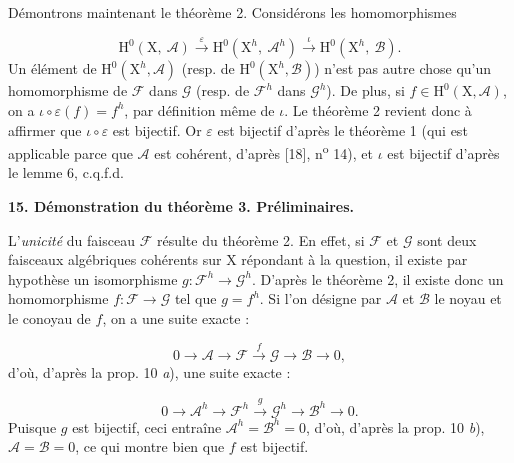 
Démontrons maintenant le théorème 2. Considérons les homomorphismes

\begin{equation*}
\mathrm{H}^0(\mathrm{X},\ \mathcal{A}) \xrightarrow{\varepsilon} \mathrm{H}^0(\mathrm{X}^h,\ \mathcal{A}^h) \xrightarrow{\iota} \mathrm{H}^0(\mathrm{X}^h,\ \mathcal{B}).
\end{equation*}
Un élément de $\mathrm{H}^0(\mathrm{X}^h, \mathcal{A})$ (resp. de $\mathrm{H}^0(\mathrm{X}^h, \mathcal{B})$) n'est pas autre chose qu'un homomorphisme de $\mathcal{F}$ dans $\mathcal{G}$ (resp. de $\mathcal{F}^h$ dans $\mathcal{G}^h$). De plus, si $f \in \mathrm{H}^0(\mathrm{X}, \mathcal{A})$, on a $\iota \circ \varepsilon(f) = f^h$, par définition même de $\iota$. Le théorème 2 revient donc à affirmer que $\iota \circ \varepsilon$ est bijectif. Or $\varepsilon$ est bijectif d'après le théorème 1 (qui est applicable parce que $\mathcal{A}$ est cohérent, d'après [18], n\textsuperscript{o} 14), et $\iota$ est bijectif d'après le lemme 6, c.q.f.d.


\textbf{15. Démonstration du théorème 3. Préliminaires.}

L'\textit{unicité} du faisceau $\mathcal{F}$ résulte du théorème 2. En effet, si $\mathcal{F}$ et $\mathcal{G}$ sont deux faisceaux algébriques cohérents sur $\mathrm{X}$ répondant à la question, il existe par hypothèse un isomorphisme $g : \mathcal{F}^h \to \mathcal{G}^h$. D'après le théorème 2, il existe donc un homomorphisme $f : \mathcal{F} \to \mathcal{G}$ tel que $g = f^h$. Si l'on désigne par $\mathcal{A}$ et $\mathcal{B}$ le noyau et le conoyau de $f$, on a une suite exacte :

\begin{equation*}
0 \to \mathcal{A} \to \mathcal{F} \xrightarrow{f} \mathcal{G} \to \mathcal{B} \to 0,
\end{equation*}
d'où, d'après la prop. 10 \textit{a}), une suite exacte :

\begin{equation*}
0 \to \mathcal{A}^h \to \mathcal{F}^h \xrightarrow{g} \mathcal{G}^h \to \mathcal{B}^h \to 0.
\end{equation*}
Puisque $g$ est bijectif, ceci entraîne $\mathcal{A}^h = \mathcal{B}^h = 0$, d'où, d'après la prop. 10 \textit{b}), $\mathcal{A} = \mathcal{B} = 0$, ce qui montre bien que $f$ est bijectif.

